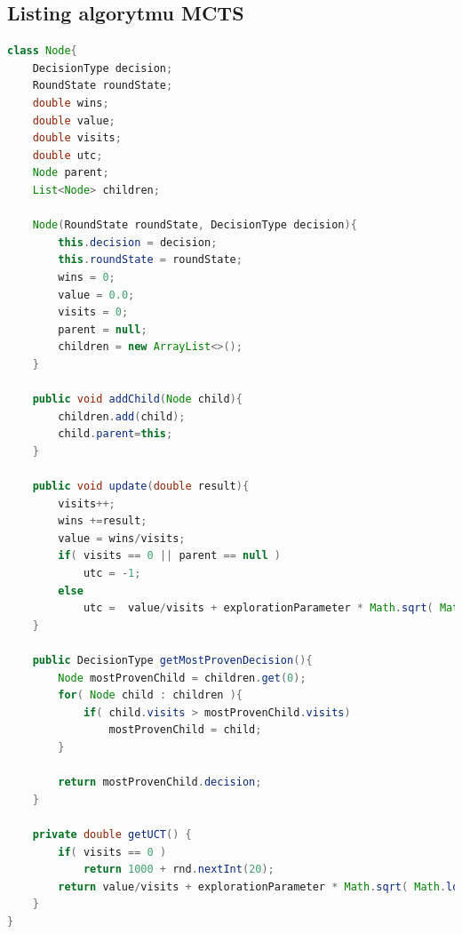 \subsection{Listing algorytmu MCTS}

\begin{lstlisting}[language=java,label=lst:node,caption=Klasa Node, breaklines=true]
class Node{
	DecisionType decision;
	RoundState roundState;
	double wins;
	double value;
	double visits;
	double utc;
	Node parent;
	List<Node> children;
	
	Node(RoundState roundState, DecisionType decision){
		this.decision = decision;
		this.roundState = roundState;
		wins = 0;
		value = 0.0;
		visits = 0;
		parent = null;
		children = new ArrayList<>();
	}
	
	public void addChild(Node child){
		children.add(child);
		child.parent=this;
	}
	
	public void update(double result){
		visits++;
		wins +=result;
		value = wins/visits;
		if( visits == 0 || parent == null )
			utc = -1;
		else
			utc =  value/visits + explorationParameter * Math.sqrt( Math.log( parent.visits ) / visits);
	}
	
	public DecisionType getMostProvenDecision(){
		Node mostProvenChild = children.get(0);
		for( Node child : children ){
			if( child.visits > mostProvenChild.visits)
				mostProvenChild = child;
		}
		
		return mostProvenChild.decision;
	}
	
	private double getUCT() {
		if( visits == 0 )
			return 1000 + rnd.nextInt(20);
		return value/visits + explorationParameter * Math.sqrt( Math.log( parent.visits ) / visits);
	}
}

\end{lstlisting}

